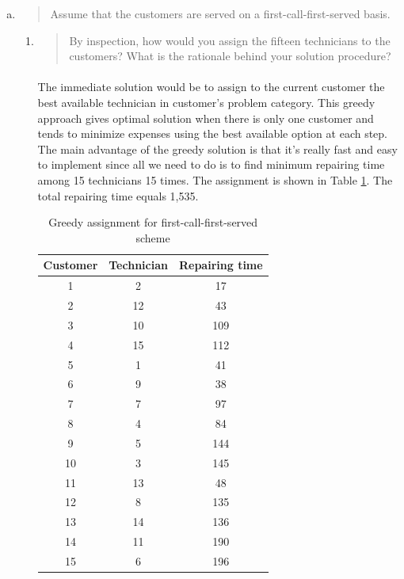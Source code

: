 \begin{enumerate}[(a)]
\item\begin{quote}Assume that the customers are served on a first-call-first-served basis.\end{quote}
\begin{enumerate}[1.]
\item\begin{quote}By inspection, how would you assign the fifteen technicians to the customers?
What is the rationale behind your solution procedure?\end{quote}

	\paragraph{}
	The immediate solution would be to assign to the current customer the best available technician in customer's problem category. This greedy approach gives optimal solution when there is only one customer and tends to minimize expenses using the best available option at each step. The main advantage of the greedy solution is that it's really fast and easy to implement since all we need to do is to find minimum repairing time among 15 technicians 15 times. The assignment is shown in Table \ref{greedy-1-a}. The total repairing time equals 1,535.

\begin{table}[H]
	\centering
	\caption{Greedy assignment for first-call-first-served scheme}
	\begin{tabular}{|c|c|c|}\hline
	Customer & Technician & Repairing time \\ \hline
1 & 2 & 17 \\
2 & 12 & 43 \\
3 & 10 & 109 \\
4 & 15 & 112 \\
5 & 1 & 41 \\
6 & 9 & 38 \\
7 & 7 & 97 \\
8 & 4 & 84 \\
9 & 5 & 144 \\
10 & 3 & 145 \\
11 & 13 & 48 \\
12 & 8 & 135 \\
13 & 14 & 136 \\
14 & 11 & 190 \\
15 & 6 & 196 \\
\hline
	\end{tabular}
	\label{greedy-1-a}
\end{table}


\end{enumerate}
\end{enumerate}
